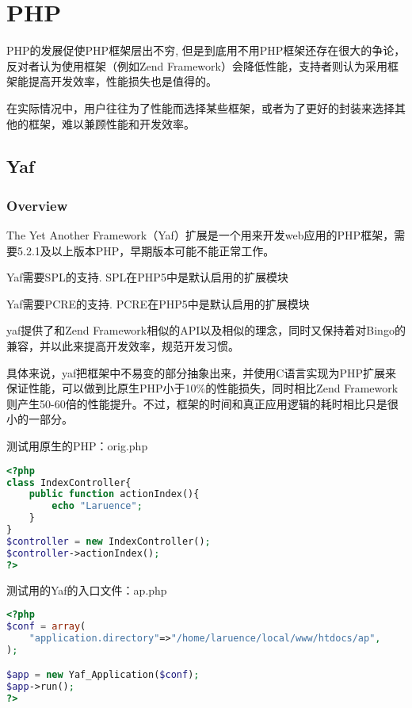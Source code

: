 \chapter{PHP}


PHP的发展促使PHP框架层出不穷, 但是到底用不用PHP框架还存在很大的争论，反对者认为使用框架（例如Zend Framework）会降低性能，支持者则认为采用框架能提高开发效率，性能损失也是值得的。

在实际情况中，用户往往为了性能而选择某些框架，或者为了更好的封装来选择其他的框架，难以兼顾性能和开发效率。



\section{Yaf}


\subsection{Overview}


The Yet Another Framework（Yaf）扩展是一个用来开发web应用的PHP框架，需要5.2.1及以上版本PHP，早期版本可能不能正常工作。

\begin{compactitem}
\item Yaf需要SPL的支持. SPL在PHP5中是默认启用的扩展模块
\item Yaf需要PCRE的支持. PCRE在PHP5中是默认启用的扩展模块
\end{compactitem}

yaf提供了和Zend Framework相似的API以及相似的理念，同时又保持着对Bingo的兼容，并以此来提高开发效率，规范开发习惯。

具体来说，yaf把框架中不易变的部分抽象出来，并使用C语言实现为PHP扩展来保证性能，可以做到比原生PHP小于10\%的性能损失，同时相比Zend Framework则产生50-60倍的性能提升。不过，框架的时间和真正应用逻辑的耗时相比只是很小的一部分。


测试用原生的PHP：orig.php

\begin{lstlisting}[language=PHP]
<?php
class IndexController{
	public function actionIndex(){
		echo "Laruence";
	}
}
$controller = new IndexController();
$controller->actionIndex();
?>
\end{lstlisting}

测试用的Yaf的入口文件：ap.php

\begin{lstlisting}[language=PHP]
<?php
$conf = array(
	"application.directory"=>"/home/laruence/local/www/htdocs/ap",
);

$app = new Yaf_Application($conf);
$app->run();
?>
\end{lstlisting}

